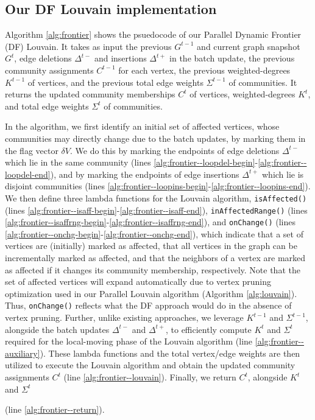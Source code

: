 





\subsection{Our DF Louvain implementation}
\label{sec:our-frontier}

Algorithm \ref{alg:frontier} shows the psuedocode of our Parallel Dynamic Frontier (DF) Louvain. It takes as input the previous $G^{t-1}$ and current graph snapshot $G^t$, edge deletions $\Delta^{t-}$ and insertions $\Delta^{t+}$ in the batch update, the previous community assignments $C^{t-1}$ for each vertex, the previous weighted-degrees $K^{t-1}$ of vertices, and the previous total edge weights $\Sigma^{t-1}$ of communities. It returns the updated community memberships $C^t$ of vertices, weighted-degrees $K^t$, and total edge weights $\Sigma^t$ of communities.



In the algorithm, we first identify an initial set of affected vertices, whose communities may directly change due to the batch updates, by marking them in the flag vector $\delta V$. We do this by marking the endpoints of edge deletions $\Delta^{t-}$ which lie in the same community (lines \ref{alg:frontier--loopdel-begin}-\ref{alg:frontier--loopdel-end}), and by marking the endpoints of edge insertions $\Delta^{t+}$ which lie is disjoint communities (lines \ref{alg:frontier--loopins-begin}-\ref{alg:frontier--loopins-end}). We then define three lambda functions for the Louvain algorithm, \texttt{isAffected()} (lines \ref{alg:frontier--isaff-begin}-\ref{alg:frontier--isaff-end}), \texttt{inAffectedRange()} (lines \ref{alg:frontier--isaffrng-begin}-\ref{alg:frontier--isaffrng-end}), and \texttt{onChange()} (lines \ref{alg:frontier--onchg-begin}-\ref{alg:frontier--onchg-end}), which indicate that a set of vertices are (initially) marked as affected, that all vertices in the graph can be incrementally marked as affected, and that the neighbors of a vertex are marked as affected if it changes its community membership, respectively. Note that the set of affected vertices will expand automatically due to vertex pruning optimization used in our Parallel Louvain algorithm (Algorithm \ref{alg:louvain}). Thus, \texttt{onChange()} reflects what the DF approach would do in the absence of vertex pruning. Further, unlike existing approaches, we leverage $K^{t-1}$ and $\Sigma^{t-1}$, alongside the batch updates $\Delta^{t-}$ and $\Delta^{t+}$, to efficiently compute $K^t$ and $\Sigma^t$ required for the local-moving phase of the Louvain algorithm (line \ref{alg:frontier--auxiliary}). These lambda functions and the total vertex/edge weights are then utilized to execute the Louvain algorithm and obtain the updated community assignments $C^t$ (line \ref{alg:frontier--louvain}). Finally, we return $C^t$, alongside $K^t$ and $\Sigma^t$ (line \ref{alg:frontier--return}).




